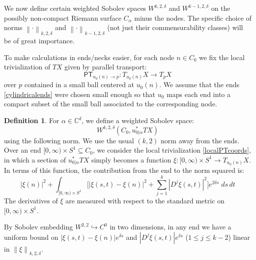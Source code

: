 \documentclass[12pt]{article}
\theoremstyle{definition}
\newtheorem{definition}[theorem]{Definition}
\theoremstyle{remark}
\numberwithin{equation}{subsection}
\newcommand{\CC}{\mathbb C}
\newcommand{\PT}{\mathsf{PT}}
\begin{document}
We now define certain weighted Sobolev spaces $W^{k,2,\delta}$ and $W^{k-1,2,\delta}$ on the possibly non-compact Riemann surface $C_\alpha$ minus the nodes.  The specific choice of norms $\left\|\cdot\right\|_{k,2,\delta}$ and $\left\|\cdot\right\|_{k-1,2,\delta}$ (not just their commensurability classes) will be of great importance.

To make calculations in ends/necks easier, for each node $n\in C_0$ we fix the local trivialization of $TX$ given by parallel transport:
\begin{equation}\label{localPTcoords}
\PT_{u_0(n)\to p}:T_{u_0(n)}X\to T_pX
\end{equation}
over $p$ contained in a small ball centered at $u_0(n)$.  We assume that the ends \eqref{cylindricalends} were chosen small enough so that $u_0$ maps each end into a compact subset of the small ball associated to the corresponding node.

\begin{definition}
For $\alpha\in\CC^d$, we define a weighted Sobolev space:
\begin{equation}
W^{k,2,\delta}(C_0,u_{0|\alpha}^\ast TX)
\end{equation}
using the following norm.  We use the usual $(k,2)$ norm away from the ends.  Over an end $[0,\infty)\times S^1\subseteq C_0$, we consider the local trivialization \eqref{localPTcoords}, in which a section of $u_{0|\alpha}^\ast TX$ simply becomes a function $\xi:[0,\infty)\times S^1\to T_{u_0(n)}X$.  In terms of this function, the contribution from the end to the norm squared is:
\begin{equation}\label{endnorm}
\left|\xi(n)\right|^2+\int_{[0,\infty)\times S^1}\biggl[\left|\xi(s,t)-\xi(n)\right|^2+\sum_{j=1}^k\left|D^j\xi(s,t)\right|^2\biggr]e^{2\delta s}\;ds\,dt
\end{equation}
The derivatives of $\xi$ are measured with respect to the standard metric on $[0,\infty)\times S^1$.

By Sobolev embedding $W^{2,2}\hookrightarrow C^0$ in two dimensions, in any end we have a uniform bound on $\left|\xi(s,t)-\xi(n)\right|e^{\delta s}$ and $\left|D^j\xi(s,t)\right|e^{\delta s}$ ($1\leq j\leq k-2$) linear in $\left\|\xi\right\|_{k,2,\delta}$.
\end{definition}
\end{document}
